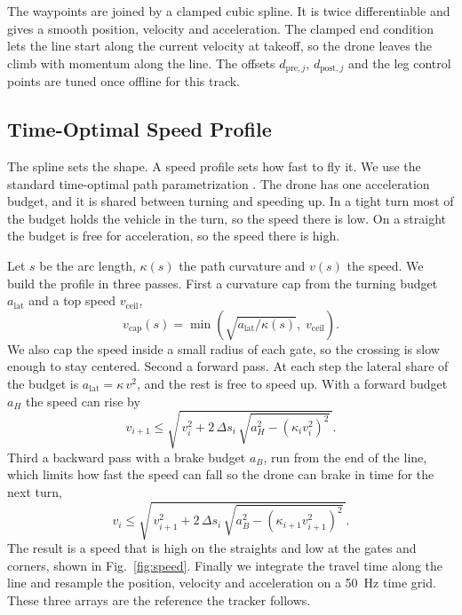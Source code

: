 \documentclass[conference]{IEEEtran}
\begin{document}
The waypoints are joined by a clamped cubic spline. It is twice differentiable and gives a smooth position, velocity and acceleration. The clamped end condition lets the line start along the current velocity at takeoff, so the drone leaves the climb with momentum along the line. The offsets $d_{\text{pre},j}$, $d_{\text{post},j}$ and the leg control points are tuned once offline for this track.

\subsection{Time-Optimal Speed Profile}
\label{sec:speed}
The spline sets the shape. A speed profile sets how fast to fly it. We use the standard time-optimal path parametrization \cite{kunz,verscheure}. The drone has one acceleration budget, and it is shared between turning and speeding up. In a tight turn most of the budget holds the vehicle in the turn, so the speed there is low. On a straight the budget is free for acceleration, so the speed there is high.

Let $s$ be the arc length, $\kappa(s)$ the path curvature and $v(s)$ the speed. We build the profile in three passes. First a curvature cap from the turning budget $a_{\text{lat}}$ and a top speed $v_{\text{ceil}}$,
\begin{equation}
v_{\text{cap}}(s) = \min\!\left( \sqrt{a_{\text{lat}} / \kappa(s)},\; v_{\text{ceil}} \right).
\label{eq:curv}
\end{equation}
We also cap the speed inside a small radius of each gate, so the crossing is slow enough to stay centered. Second a forward pass. At each step the lateral share of the budget is $a_{\text{lat}} = \kappa\, v^2$, and the rest is free to speed up. With a forward budget $a_H$ the speed can rise by
\begin{equation}
v_{i+1} \le \sqrt{\, v_i^2 + 2\,\Delta s_i\, \sqrt{a_H^2 - (\kappa_i v_i^2)^2}\, }.
\label{eq:fwd}
\end{equation}
Third a backward pass with a brake budget $a_B$, run from the end of the line, which limits how fast the speed can fall so the drone can brake in time for the next turn,
\begin{equation}
v_i \le \sqrt{\, v_{i+1}^2 + 2\,\Delta s_i\, \sqrt{a_B^2 - (\kappa_{i+1} v_{i+1}^2)^2}\, }.
\label{eq:bwd}
\end{equation}
The result is a speed that is high on the straights and low at the gates and corners, shown in Fig.~\ref{fig:speed}. Finally we integrate the travel time along the line and resample the position, velocity and acceleration on a 50~Hz time grid. These three arrays are the reference the tracker follows.
\end{document}
